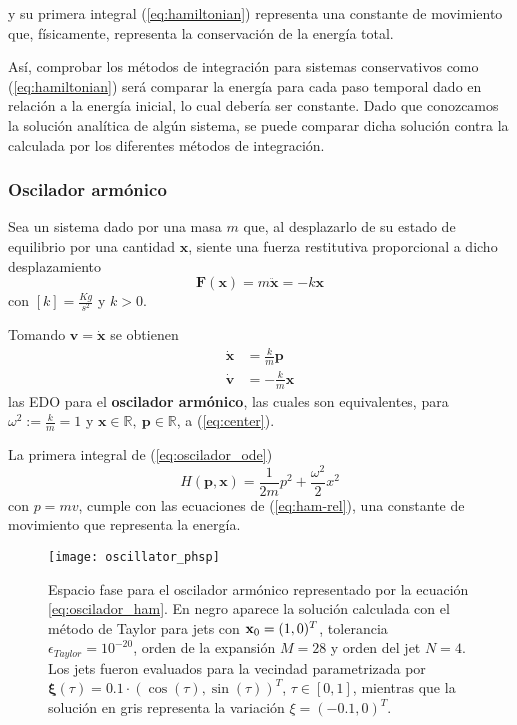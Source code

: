 y su primera integral (\ref{eq:hamiltonian}) representa una constante de movimiento que, físicamente, representa la conservación de la energía total.

Así, comprobar los métodos de integración para sistemas conservativos como (\ref{eq:hamiltonian}) será comparar la energía para cada paso temporal dado en relación a la energía inicial, lo cual debería ser constante. 
Dado que conozcamos la solución analítica de algún sistema, se puede comparar dicha solución contra la calculada por los diferentes métodos de integración.

\subsubsection{Oscilador armónico}
\label{sec:oscilador}
Sea un sistema dado por una masa $m$ que, al desplazarlo de su estado de equilibrio por una cantidad $\mathbf{x}$, siente una fuerza restitutiva proporcional a dicho desplazamiento
\begin{equation}
 \mathbf{F}(\mathbf{x}) = m \ddot{\mathbf{x}} = - k\mathbf{x}
 \label{eq:oscilador_force}
\end{equation}
con $[k] = \frac{Kg}{s^2}$  y $k>0$. 

Tomando $\mathbf{v} = \dot{\mathbf{x}}$ se obtienen
\begin{align}
 \dot{\mathbf{x}} &= \frac{k}{m} \mathbf{p} \nonumber \\
 \dot{\mathbf{v}} &= - \frac{k}{m} \mathbf{x}
 \label{eq:oscilador_ode}
\end{align}
las EDO para el \textbf{oscilador armónico}, las cuales son equivalentes, para $\omega^2 := \frac{k}{m} = 1$ y $\mathbf{x} \in \mathbb{R},\ \mathbf{p} \in \mathbb{R}$, a (\ref{eq:center}). 

La primera integral de (\ref{eq:oscilador_ode})
\begin{equation}
 H(\mathbf{p},\mathbf{x}) = \frac{1}{2m}p^2 + \frac{\omega^2}{2} x^2
 \label{eq:oscilador_ham}
\end{equation}
con $p=mv$, cumple con las ecuaciones de (\ref{eq:ham-rel}), una constante de movimiento que representa la energía.

\begin{figure}[h!]
 \centering
 \texttt{[image: oscillator\_phsp]}
 \caption{Espacio fase para el oscilador armónico representado por la ecuación \ref{eq:oscilador_ham}. En negro aparece la solución calculada con el método de Taylor para jets con $\mathbf{x}_0 = (1,0)^T$, tolerancia $\epsilon_{Taylor} = 10^{-20}$, orden de la expansión $M = 28$ y orden del jet $N=4$. Los jets fueron evaluados para la vecindad parametrizada por $\mathbf{\xi}(\tau) = 0.1\cdot \left( \cos(\tau), \sin(\tau) \right)^T$, $\tau \in [0,1]$, mientras que la solución en gris representa la variación $\xi = (-0.1,0)^T$.}
 \label{fig:oscilador_phsp}
\end{figure}

